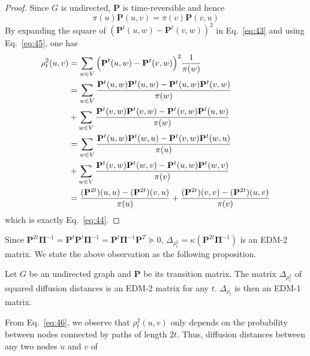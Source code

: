 \begin{proof}
  Since $G$ is undirected, $\mathbf{P}$ is time-reversible and hence
  \begin{equation}
    \label{eq:45}
    \pi(u) \mathbf{P}(u,v) = \pi(v) \mathbf{P}(v,u) 
  \end{equation}
  By
  expanding the square of $(\mathbf{P}^{t}(u,w) - \mathbf{P}^{t}(v,w))^{2}$ in
  Eq.~\eqref{eq:43} and using Eq.~\eqref{eq:45}, one has
  \begin{equation}
    \label{eq:46}
    \begin{split}
      \rho_{t}^{2}(u,v) &= \sum_{w \in V}{\Bigl(\mathbf{P}^{t}(u,w) -
        \mathbf{P}^{t}(v,w)\Bigr)^2 \frac{1}{\pi(w)}} \\
      &= \sum_{w \in V}{\frac{\mathbf{P}^{t}(u,w)\mathbf{P}^{t}(u,w) -
          \mathbf{P}^{t}(u,w)\mathbf{P}^{t}(v,w)}{\pi(w)}} \\
      &+\sum_{w \in V}{\frac{\mathbf{P}^{t}(v,w)\mathbf{P}^{t}(v,w) -
          \mathbf{P}^{t}(v,w)\mathbf{P}^{t}(u,w)}{\pi(w)}} \\
      &= \sum_{w \in
        V}{\frac{\mathbf{P}^{t}(u,w)\mathbf{P}^{t}(w,u) -
          \mathbf{P}^{t}(v,w)\mathbf{P}^{t}(w,u)}{\pi(u)}} \\ &+
      \sum_{w \in V}{\frac{\mathbf{P}^{t}(v,w)\mathbf{P}^{t}(w,v)
          -
          \mathbf{P}^{t}(u,w)\mathbf{P}^{t}(w,v)}{\pi(v)}} \\
      &= \frac{(\mathbf{P}^{2t})(u,u) -
        (\mathbf{P}^{2t})(v,u)}{\pi(u)} +
      \frac{(\mathbf{P}^{2t})(v,v) -
        (\mathbf{P}^{2t})(u,v)}{\pi(v)} 
    \end{split} 
  \end{equation}
  which is exactly Eq.~\eqref{eq:44}. 
\end{proof} 
Since $\mathbf{P}^{2t}\bm{\Pi}^{-1} =
\mathbf{P}^{t}\mathbf{P}^{t}\bm{\Pi}^{-1} =
\mathbf{P}^{t}\bm{\Pi}^{-1}\mathbf{P}^{T} \succeq 0$,
$\Delta_{\rho_{t}^2} = \kappa(\mathbf{P}^{2t}\bm{\Pi}^{-1})$ is an
EDM-2 matrix. We state the above observation as the following
proposition.
\begin{proposition} 
\label{prop:14} 
Let $G$ be an undirected graph and $\mathbf{P}$ be its transition
matrix. The matrix $\Delta_{\rho_{t}^2}$ of squared diffusion distances is 
an EDM-2 matrix for any $t$. $\Delta_{\rho_t}$ is then an EDM-1 matrix.
\end{proposition}
%
From Eq.~\eqref{eq:46}, we observe that $\rho_{t}^{2}(u,v)$ only
depends on the probability between nodes connected by paths of length
$2t$. Thus, diffusion distances between any two nodes $u$ and $v$ of
